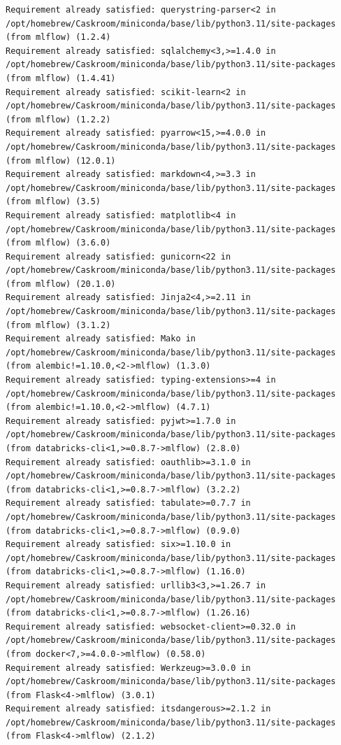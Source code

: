 \documentclass[
  letterpaper,
  DIV=11,
  numbers=noendperiod]{scrartcl}
\begin{document}
\begin{verbatim}
Requirement already satisfied: querystring-parser<2 in /opt/homebrew/Caskroom/miniconda/base/lib/python3.11/site-packages (from mlflow) (1.2.4)
Requirement already satisfied: sqlalchemy<3,>=1.4.0 in /opt/homebrew/Caskroom/miniconda/base/lib/python3.11/site-packages (from mlflow) (1.4.41)
Requirement already satisfied: scikit-learn<2 in /opt/homebrew/Caskroom/miniconda/base/lib/python3.11/site-packages (from mlflow) (1.2.2)
Requirement already satisfied: pyarrow<15,>=4.0.0 in /opt/homebrew/Caskroom/miniconda/base/lib/python3.11/site-packages (from mlflow) (12.0.1)
Requirement already satisfied: markdown<4,>=3.3 in /opt/homebrew/Caskroom/miniconda/base/lib/python3.11/site-packages (from mlflow) (3.5)
Requirement already satisfied: matplotlib<4 in /opt/homebrew/Caskroom/miniconda/base/lib/python3.11/site-packages (from mlflow) (3.6.0)
Requirement already satisfied: gunicorn<22 in /opt/homebrew/Caskroom/miniconda/base/lib/python3.11/site-packages (from mlflow) (20.1.0)
Requirement already satisfied: Jinja2<4,>=2.11 in /opt/homebrew/Caskroom/miniconda/base/lib/python3.11/site-packages (from mlflow) (3.1.2)
Requirement already satisfied: Mako in /opt/homebrew/Caskroom/miniconda/base/lib/python3.11/site-packages (from alembic!=1.10.0,<2->mlflow) (1.3.0)
Requirement already satisfied: typing-extensions>=4 in /opt/homebrew/Caskroom/miniconda/base/lib/python3.11/site-packages (from alembic!=1.10.0,<2->mlflow) (4.7.1)
Requirement already satisfied: pyjwt>=1.7.0 in /opt/homebrew/Caskroom/miniconda/base/lib/python3.11/site-packages (from databricks-cli<1,>=0.8.7->mlflow) (2.8.0)
Requirement already satisfied: oauthlib>=3.1.0 in /opt/homebrew/Caskroom/miniconda/base/lib/python3.11/site-packages (from databricks-cli<1,>=0.8.7->mlflow) (3.2.2)
Requirement already satisfied: tabulate>=0.7.7 in /opt/homebrew/Caskroom/miniconda/base/lib/python3.11/site-packages (from databricks-cli<1,>=0.8.7->mlflow) (0.9.0)
Requirement already satisfied: six>=1.10.0 in /opt/homebrew/Caskroom/miniconda/base/lib/python3.11/site-packages (from databricks-cli<1,>=0.8.7->mlflow) (1.16.0)
Requirement already satisfied: urllib3<3,>=1.26.7 in /opt/homebrew/Caskroom/miniconda/base/lib/python3.11/site-packages (from databricks-cli<1,>=0.8.7->mlflow) (1.26.16)
Requirement already satisfied: websocket-client>=0.32.0 in /opt/homebrew/Caskroom/miniconda/base/lib/python3.11/site-packages (from docker<7,>=4.0.0->mlflow) (0.58.0)
Requirement already satisfied: Werkzeug>=3.0.0 in /opt/homebrew/Caskroom/miniconda/base/lib/python3.11/site-packages (from Flask<4->mlflow) (3.0.1)
Requirement already satisfied: itsdangerous>=2.1.2 in /opt/homebrew/Caskroom/miniconda/base/lib/python3.11/site-packages (from Flask<4->mlflow) (2.1.2)

\end{verbatim}
\end{document}
